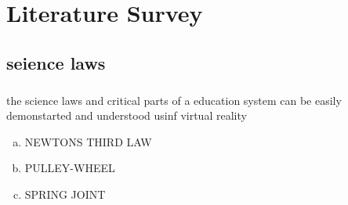 \chapter{Literature Survey}
\section{seience laws}
\paragraph{}the science laws and critical parts of a education system can be easily demonstarted and understood usinf virtual reality
\begin{enumerate}[a. ]
 \item NEWTONS THIRD LAW
 \item PULLEY-WHEEL
 \item SPRING JOINT
\end{enumerate}